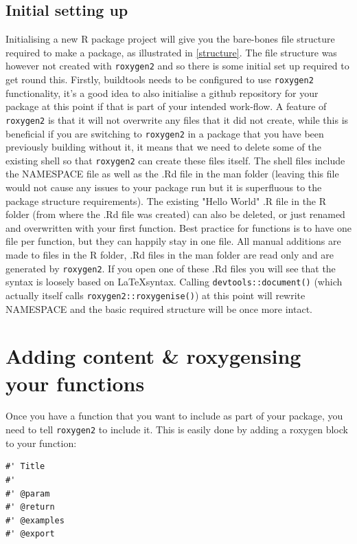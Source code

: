 \documentclass[a4paper,11pt]{article}
\begin{document}
\subsection{Initial setting up}
Initialising a new R package project will give you the bare-bones file structure required to make a package, as illustrated in \ref{structure}. The file structure was however not created with \texttt{roxygen2} and so there is some initial set up required to get round this. Firstly, buildtools needs to be configured to use \texttt{roxygen2} functionality, it's a good idea to also initialise a github repository for your package at this point if that is part of your intended work-flow. A feature of \texttt{roxygen2} is that it will not overwrite any files that it did not create, while this is beneficial if you are switching to \texttt{roxygen2} in a package that you have been previously building without it, it means that we need to delete some of the existing shell so that \texttt{roxygen2} can create these files itself. The shell files include the NAMESPACE file as well as the .Rd file in the man folder (leaving this file would not cause any issues to your package run but it is superfluous to the package structure requirements). The existing "Hello World" .R file in the R folder (from where the .Rd file was created) can also be deleted, or just renamed and overwritten with your first function. Best practice for functions is to have one file per function, but they can happily stay in one file. All manual additions are made to files in the R folder, .Rd files in the man folder are read only and are generated by \texttt{roxygen2}. If you open one of these .Rd files you will see that the syntax is loosely based on \LaTeX  syntax. Calling \texttt{devtools::document()} (which actually itself calls \texttt{roxygen2::roxygenise()}) at this point will rewrite NAMESPACE and the basic required structure will be once more intact.

\section{Adding content \& roxygensing your functions}
Once you have a function that you want to include as part of your package, you need to tell \texttt{roxygen2} to include it. This is easily done by adding a roxygen block to your function:

\begin{lstlisting}[frame=single]
#' Title
#'
#' @param
#' @return
#' @examples
#' @export
\end{lstlisting}
\end{document}
